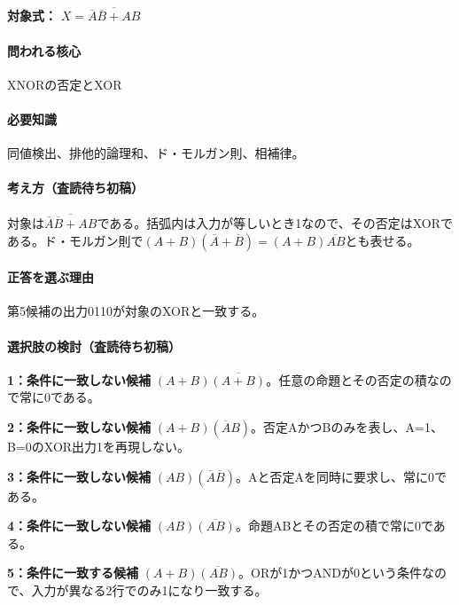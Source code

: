 \noindent\textbf{対象式：} \(X=\overline{\overline A\overline B+AB}\)\par

\paragraph{問われる核心} XNORの否定とXOR

\paragraph{必要知識} 同値検出、排他的論理和、ド・モルガン則、相補律。

\paragraph{考え方（査読待ち初稿）} 対象は\(\overline{\overline A\overline B+AB}\)である。括弧内は入力が等しいとき1なので、その否定はXORである。ド・モルガン則で\((A+B)(\overline A+\overline B)=(A+B)\overline{AB}\)とも表せる。

\paragraph{正答を選ぶ理由} 第5候補の出力0110が対象のXORと一致する。

\paragraph{選択肢の検討（査読待ち初稿）}\mbox{}\par

\noindent\textbf{1：条件に一致しない候補} \((A+B)\overline{(A+B)}\)。任意の命題とその否定の積なので常に0である。\par

\noindent\textbf{2：条件に一致しない候補} \((A+B)(\overline A B)\)。否定AかつBのみを表し、A=\allowbreak{}1、B=\allowbreak{}0のXOR出力1を再現しない。\par

\noindent\textbf{3：条件に一致しない候補} \((AB)(\overline A\overline B)\)。Aと否定Aを同時に要求し、常に0である。\par

\noindent\textbf{4：条件に一致しない候補} \((AB)\overline{(AB)}\)。命題ABとその否定の積で常に0である。\par

\noindent\textbf{5：条件に一致する候補} \((A+B)\overline{(AB)}\)。ORが1かつANDが0という条件なので、入力が異なる2行でのみ1になり一致する。\par

